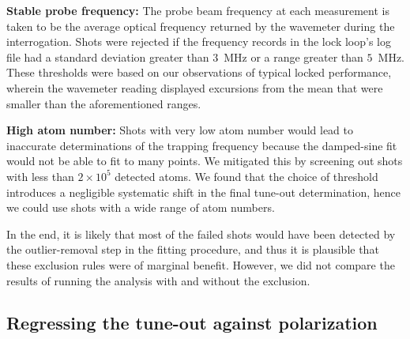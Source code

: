 	\textbf{Stable probe frequency:}		The probe beam frequency at each measurement is taken to be the average optical frequency returned by the wavemeter during the interrogation. Shots were rejected if the frequency records in the lock loop's log file had a standard deviation greater than $3$~MHz or a range greater than $5$~MHz. These thresholds were based on our observations of typical locked performance, wherein the wavemeter reading displayed excursions from the mean that were smaller than the aforementioned ranges.

	\textbf{High atom number:}		Shots with very low atom number would lead to inaccurate determinations of the trapping frequency because the damped-sine fit would not be able to fit to many points. We mitigated this by screening out shots with less than $2\times10^{5}$ detected atoms. We found that the choice of threshold introduces a negligible systematic shift in the final tune-out determination, hence we could use shots with a wide range of atom numbers.


	In the end, it is likely that most of the failed shots would have been detected by the outlier-removal step in the fitting procedure, and thus it is plausible that these exclusion rules were of marginal benefit. However, we did not compare the results of running the analysis with and without the exclusion.

\subsection{Regressing the tune-out against polarization}
 \label{sec:fitting}
	
	
